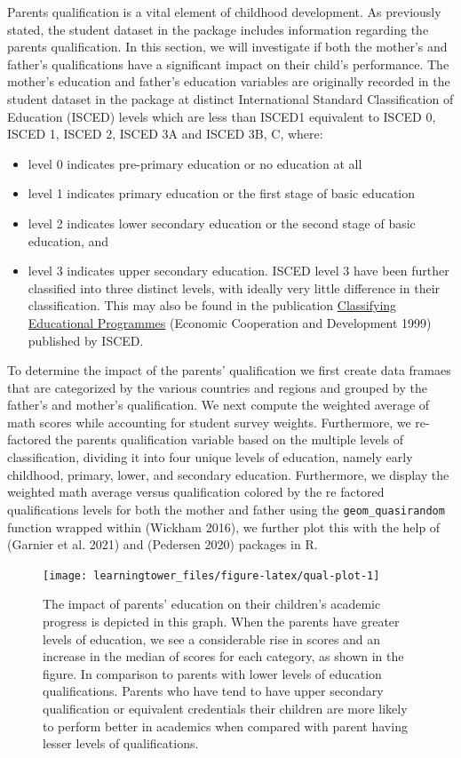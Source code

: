 Parents qualification is a vital element of childhood development. As previously stated, the student dataset in the package includes information regarding the parents qualification. In this section, we will investigate if both the mother's and father's qualifications have a significant impact on their child's performance. The mother's education and father's education variables are originally recorded in the student dataset in the  package at distinct International Standard Classification of Education (ISCED) levels which are less than ISCED1 equivalent to ISCED 0, ISCED 1, ISCED 2, ISCED 3A and ISCED 3B, C, where:

\begin{itemize}
\tightlist
\item
  level 0 indicates pre-primary education or no education at all
\item
  level 1 indicates primary education or the first stage of basic education
\item
  level 2 indicates lower secondary education or the second stage of basic education, and
\item
  level 3 indicates upper secondary education. ISCED level 3 have been further classified into three distinct levels, with ideally very little difference in their classification. This may also be found in the publication \href{https://www.oecd.org/education/1841854.pdf}{Classifying Educational Programmes} (Economic Cooperation and Development 1999) published by ISCED.
\end{itemize}

To determine the impact of the parents' qualification we first create data framaes that are categorized by the various countries and regions and grouped by the father's and mother's qualification. We next compute the weighted average of math scores while accounting for student survey weights. Furthermore, we re-factored the parents qualification variable based on the multiple levels of classification, dividing it into four unique levels of education, namely early childhood, primary, lower, and secondary education. Furthermore, we display the weighted math average versus qualification colored by the re factored qualifications levels for both the mother and father using the \texttt{geom\_quasirandom} function wrapped within  (Wickham 2016), we further plot this with the help of  (Garnier et al. 2021) and  (Pedersen 2020) packages in R.

\begin{figure}[H]
\texttt{[image: learningtower\_files/figure-latex/qual-plot-1]} \caption{The impact of parents' education on their children's academic progress is depicted in this graph. When the parents have greater levels of education, we see a considerable rise in scores and an increase in the median of scores for each category, as shown in the figure. In comparison to parents with lower levels of education qualifications. Parents who have tend to have upper secondary qualification or equivalent credentials their children are more likely to perform better in academics when compared with parent having lesser levels of qualifications.}\label{fig:qual-plot}
\end{figure}

